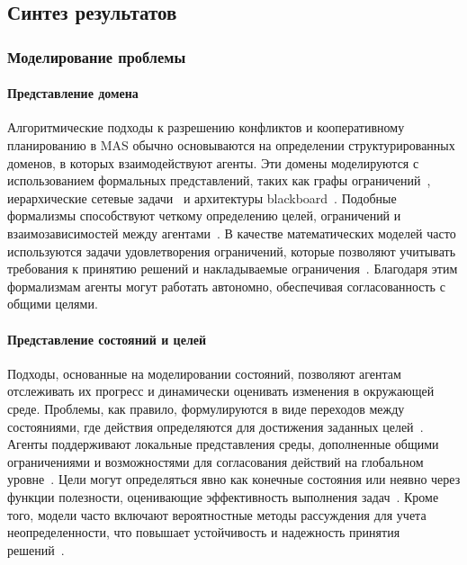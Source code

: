 \documentclass[%
]{ittmm}
\begin{document}
\subsection{Синтез результатов}

\subsubsection{Моделирование проблемы}

\paragraph{Представление домена}

Алгоритмические подходы к разрешению конфликтов и кооперативному планированию в MAS
обычно основываются на определении структурированных доменов, в которых взаимодействуют агенты.
Эти домены моделируются с использованием формальных представлений,
таких как графы ограничений~\cite{SHARON201540,SEMIZ2021220},
иерархические сетевые задачи~\cite{FRANKOVIC20017} и архитектуры blackboard~\cite{DURFEE1988268}.
Подобные формализмы способствуют четкому определению целей,
ограничений и взаимозависимостей между агентами~\cite{GROSZ1996269}.
В качестве математических моделей часто используются задачи удовлетворения ограничений,
которые позволяют учитывать требования к принятию решений и накладываемые ограничения~\cite{KOMENDA201476}.
Благодаря этим формализмам агенты могут работать автономно, обеспечивая согласованность с общими целями.

\paragraph{Представление состояний и целей}

Подходы, основанные на моделировании состояний, позволяют агентам отслеживать их прогресс и динамически оценивать изменения в окружающей среде.
Проблемы, как правило, формулируются в виде переходов между состояниями,
где действия определяются для достижения заданных целей~\cite{CHOUHAN2015396}.
Агенты поддерживают локальные представления среды,
дополненные общими ограничениями и возможностями для согласования действий на глобальном уровне~\cite{ROSENSCHEIN1988187}.
Цели могут определяться явно как конечные состояния или неявно через функции полезности,
оценивающие эффективность выполнения задач~\cite{MA2021103823}.
Кроме того, модели часто включают вероятностные методы рассуждения для учета неопределенности,
что повышает устойчивость и надежность принятия решений~\cite{WU2011487}.
\end{document}
